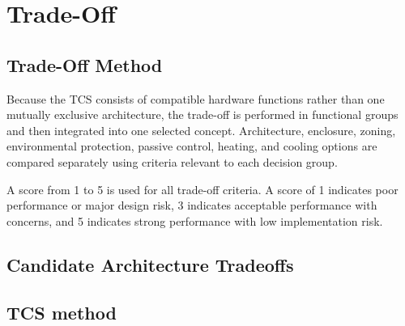 \section{Trade-Off}
\subsection{Trade-Off Method}

\label{sec:tcs_tradeoff_method}
Because the TCS consists of compatible hardware functions rather than one mutually exclusive architecture, the trade-off is performed in functional groups and then integrated into one selected concept. Architecture, enclosure, zoning, environmental protection, passive control, heating, and cooling options are compared separately using criteria relevant to each decision group.

A score from 1 to 5 is used for all trade-off criteria. A score of 1 indicates poor performance or major design risk, 3 indicates acceptable performance with concerns, and 5 indicates strong performance with low implementation risk.

\subsection{Candidate Architecture Tradeoffs}



\subsection*{TCS method}


